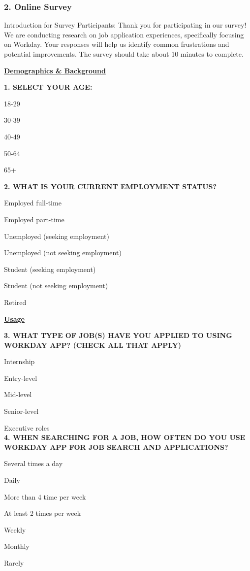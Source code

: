 \documentclass[
	letterpaper, %
]{jdf}
\begin{document}
\begin{sloppypar}
\subsubsection{2. Online Survey}
Introduction for Survey Participants:
Thank you for participating in our survey! We are conducting research on job application experiences, specifically focusing on Workday. Your responses will help us identify common frustrations and potential improvements. The survey should take about 10 minutes to complete.

\underline{\textbf{Demographics \& Background}}

\textbf{1. SELECT YOUR AGE:}

18-29

30-39

40-49

50-64

65+

\hfill \break

\textbf{2. WHAT IS YOUR CURRENT EMPLOYMENT STATUS?}

Employed full-time

Employed part-time

Unemployed (seeking employment)

Unemployed (not seeking employment)

Student (seeking employment)

Student (not seeking employment)

Retired


\underline{\textbf{Usage  }}

\textbf{3. WHAT TYPE OF JOB(S) HAVE YOU APPLIED TO USING WORKDAY APP? (CHECK ALL THAT APPLY)
}

Internship

Entry-level

Mid-level

Senior-level

Executive roles \\



\textbf{4. WHEN SEARCHING FOR A JOB, HOW OFTEN DO YOU USE WORKDAY APP FOR JOB SEARCH AND APPLICATIONS?
}

Several times a day

Daily

More than 4 time per week

At least 2 times per week

Weekly

Monthly

Rarely


\end{sloppypar}
\end{document}
